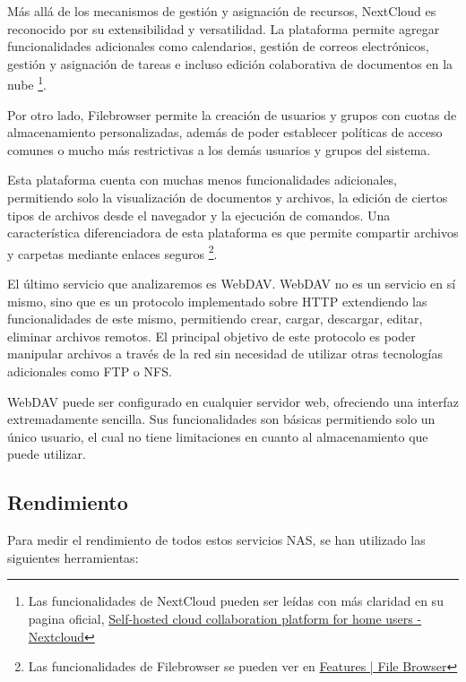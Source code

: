 \documentclass[a4paper,10pt]{article}
\begin{document}
	Más allá de los mecanismos de gestión y asignación de recursos, NextCloud es reconocido por su extensibilidad y versatilidad. La plataforma permite agregar funcionalidades adicionales como calendarios, gestión de correos electrónicos, gestión y asignación de tareas e incluso edición colaborativa de documentos en la nube \footnote{Las funcionalidades de NextCloud pueden ser leídas con más claridad en su pagina oficial, \href{https://nextcloud.com/es/athome/}{Self-hosted cloud collaboration platform for home users - Nextcloud}}.
	
	Por otro lado, Filebrowser permite la creación de usuarios y grupos con cuotas de almacenamiento personalizadas, además de poder establecer políticas de acceso comunes o mucho más restrictivas a los demás usuarios y grupos del sistema.

	Esta plataforma cuenta con muchas menos funcionalidades adicionales, permitiendo solo la visualización de documentos y archivos, la edición de ciertos tipos de archivos desde el navegador y la ejecución de comandos. Una característica diferenciadora de esta plataforma es que permite compartir archivos y carpetas mediante enlaces seguros \footnote{Las funcionalidades de Filebrowser se pueden ver en \href{https://filebrowser.org/features}{Features | File Browser}}.
	
	El último servicio que analizaremos es WebDAV. WebDAV no es un servicio en sí mismo, sino que es un protocolo implementado sobre HTTP extendiendo las funcionalidades de este mismo, permitiendo crear, cargar, descargar, editar, eliminar archivos remotos. El principal objetivo de este protocolo es poder manipular archivos a través de la red sin necesidad de utilizar otras tecnologías adicionales como FTP o NFS.

	WebDAV puede ser configurado en cualquier servidor web, ofreciendo una interfaz extremadamente sencilla. Sus funcionalidades son básicas permitiendo solo un único usuario, el cual no tiene limitaciones en cuanto al almacenamiento que puede utilizar.

	\subsection{Rendimiento}
	Para medir el rendimiento de todos estos servicios NAS, se han utilizado las siguientes herramientas:
	
\end{document}
